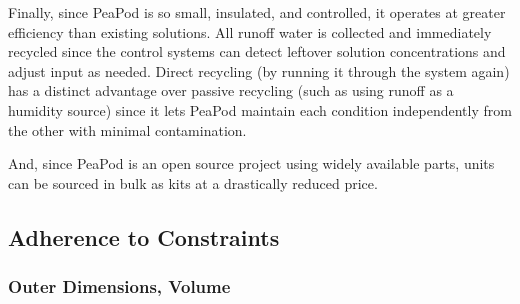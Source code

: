 \documentclass{report}
\begin{document}
Finally, since PeaPod is so small, insulated, and controlled, it operates at greater efficiency than existing solutions. All runoff water is collected and immediately recycled since the control systems can detect leftover solution concentrations and adjust input as needed. Direct recycling (by running it through the system again) has a distinct advantage over passive recycling (such as using runoff as a humidity source) since it lets PeaPod maintain each condition independently from the other with minimal contamination. 

And, since PeaPod is an open source project using widely available parts, units can be sourced in bulk as kits at a drastically reduced price.

\subsection{Adherence to Constraints}
\label{sec:constraints}



\subsubsection{Outer Dimensions, Volume} 
\label{sec:constraints-volume}



\end{document}
